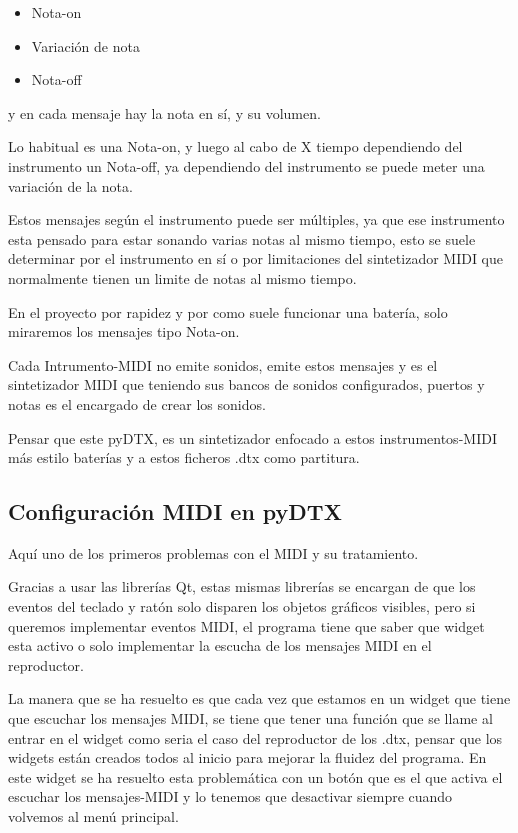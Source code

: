 \documentclass[a4paper,11pt,oneside]{book}
\begin{document}
\begin{itemize}
   \item Nota-on
   \item Variación de nota
   \item Nota-off
 \end{itemize}
 
 
y en cada mensaje hay la nota en sí, y su volumen.
 
Lo habitual es una Nota-on, y luego al cabo de X tiempo dependiendo del instrumento un Nota-off, ya dependiendo del instrumento se puede meter una variación de la nota.

Estos mensajes según el instrumento puede ser múltiples, ya que ese instrumento esta pensado para estar sonando varias notas al mismo tiempo, esto se suele determinar por el instrumento en sí  o por limitaciones del sintetizador MIDI que normalmente tienen un limite de notas al mismo tiempo.

En el proyecto por rapidez y por como suele funcionar una batería, solo miraremos los mensajes tipo Nota-on.

Cada Intrumento-MIDI no emite sonidos, emite estos mensajes y es el sintetizador MIDI que teniendo sus bancos de sonidos configurados, puertos y notas es el encargado de crear los sonidos.

Pensar que este pyDTX, es un sintetizador enfocado a estos instrumentos-MIDI más estilo baterías y a estos ficheros .dtx como partitura.

\subsection{Configuración MIDI en pyDTX}
Aquí uno de los primeros problemas con el MIDI y su tratamiento.

Gracias a usar las librerías Qt, estas mismas librerías se encargan de que los eventos del teclado y ratón solo disparen los objetos gráficos visibles, pero si queremos implementar eventos MIDI, el programa tiene que saber que widget esta activo o solo implementar la escucha de los mensajes MIDI en el reproductor.

La manera que se ha resuelto es que cada vez que estamos en un widget que tiene que escuchar los mensajes MIDI, se tiene que tener una función que se llame al entrar en el widget como seria el caso del reproductor de los .dtx, pensar que los widgets están creados todos al inicio para mejorar la fluidez del programa. En este widget se ha resuelto esta problemática con un botón que es el que activa el escuchar los mensajes-MIDI y lo tenemos que desactivar siempre cuando volvemos al menú principal.
\end{document}
